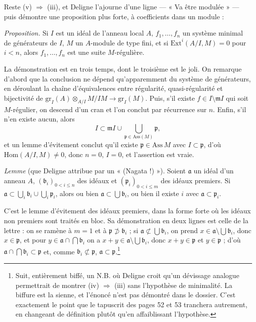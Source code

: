 \documentclass[11pt,a4paper]{article}
\begin{document}
Reste (v) $\Rightarrow$ (iii), et Deligne l'ajourne d'une ligne — « Va être
modulée » — puis démontre une proposition plus forte, à coefficients dans un
module :

\emph{Proposition.} Si $I$ est un idéal de l'anneau local $A$, $f_{1},\ldots,
f_{n}$ un système minimal de générateurs de $I$, $M$ un $A$-module de type fini,
et si $\mathrm{Ext}^{i}(A/I, M) = 0$ pour $i < n$, alors $f_{1},\ldots,f_{n}$
est une suite $M$-régulière.

La démonstration est en trois temps, dont le troisième est le joli. On remarque
d'abord que la conclusion ne dépend qu'apparemment du système de générateurs, en
déroulant la chaîne d'équivalences entre régularité, quasi-régularité et
bijectivité de $\mathrm{gr}_{I}(A) \otimes_{A/I} M/IM \to \mathrm{gr}_{I}(M)$.
Puis, s'il existe $f \in I \setminus \mathfrak{m}I$ qui soit $M$-régulier, on
descend d'un cran et l'on conclut par récurrence sur $n$. Enfin, s'il n'en
existe aucun, alors
\[
  I \subset \mathfrak{m}I \cup \bigcup_{\mathfrak{p} \in \mathrm{Ass}(M)}
  \mathfrak{p} ,
\]
et un lemme d'évitement conclut qu'il existe $\mathfrak{p} \in \mathrm{Ass}\,M$
avec $I \subset \mathfrak{p}$, d'où $\mathrm{Hom}(A/I, M) \neq 0$, donc $n = 0$,
$I = 0$, et l'assertion est vraie.

\emph{Lemme} (que Deligne attribue par un « (Nagata !) »). Soient $\mathfrak{a}$
un idéal d'un anneau $A$, $(\mathfrak{b}_{i})_{0 < i \leqslant n}$ des idéaux
et $(\mathfrak{p}_{i})_{0 < i \leqslant m}$ des idéaux premiers. Si
$\mathfrak{a} \subset \bigcup_{i} \mathfrak{b}_{i} \cup \bigcup_{i}
\mathfrak{p}_{i}$, alors ou bien $\mathfrak{a} \subset \bigcup
\mathfrak{b}_{i}$, ou bien il existe $i$ avec $\mathfrak{a} \subset
\mathfrak{p}_{i}$.

C'est le lemme d'évitement des idéaux premiers, dans la forme forte où les
idéaux non premiers sont traités en bloc. Sa démonstration en deux lignes est
celle de la lettre : on se ramène à $m = 1$ et à $\mathfrak{p} \not\supset
\mathfrak{b}_{i}$ ; si $\mathfrak{a} \not\subset \bigcup \mathfrak{b}_{i}$, on
prend $x \in \mathfrak{a} \setminus \bigcup \mathfrak{b}_{i}$, donc $x \in
\mathfrak{p}$, et pour $y \in \mathfrak{a} \cap \bigcap \mathfrak{b}_{i}$ on a
$x + y \in \mathfrak{a} \setminus \bigcup \mathfrak{b}_{i}$, donc $x+y \in
\mathfrak{p}$ et $y \in \mathfrak{p}$ ; d'où $\mathfrak{a} \cap \bigcap
\mathfrak{b}_{i} \subset \mathfrak{p}$ et, comme $\mathfrak{b}_{i} \not\subset
\mathfrak{p}$, $\mathfrak{a} \subset \mathfrak{p}$.\footnote{Suit, entièrement
biffé, un N.B. où Deligne croit qu'un dévissage analogue permettrait de montrer
(iv) $\Rightarrow$ (iii) sans l'hypothèse de minimalité. La biffure est la
sienne, et l'énoncé n'est pas démontré dans le dossier. C'est exactement le
point que le tapuscrit des pages 52 et 53 tranchera autrement, en changeant de
définition plutôt qu'en affaiblissant l'hypothèse.}
\end{document}
